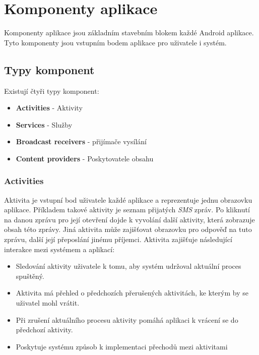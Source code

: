 \section{Komponenty aplikace}
Komponenty aplikace jsou základním stavebním blokem každé Android aplikace. Tyto komponenty jsou vstupním bodem aplikace pro uživatele i systém.

    \subsection{Typy komponent}
    Existují čtyři typy komponent:
    \begin{itemize}
        \item \textbf{Activities} - Aktivity
        \item \textbf{Services} - Služby
        \item \textbf{Broadcast receivers} - přijímače vysílání
        \item \textbf{Content providers} - Poskytovatele obsahu
    \end{itemize}

        \subsubsection{Activities}
        Aktivita je vstupní bod uživatele každé aplikace a reprezentuje jednu obrazovku aplikace. Příkladem takové aktivity je seznam přijatých \emph{SMS} zpráv. Po kliknutí na danou zprávu pro její otevření dojde k vyvolání další aktivity, která zobrazuje obsah této zprávy. Jiná aktivita může zajišťovat obrazovku pro odpověď na tuto zprávu, další její přeposlání jinému příjemci. Aktivita zajišťuje následující interakce mezi systémem a aplikací:
        \begin{itemize}
            \item Sledování aktivity uživatele k tomu, aby systém udržoval aktuální proces spuštěný.
            \item Aktivita má přehled o předchozích přerušených aktivitách, ke kterým by se uživatel mohl vrátit.
            \item Při zrušení aktuálního procesu aktivity pomáhá aplikaci k vrácení se do předchozí aktivity.
            \item Poskytuje systému způsob k implementaci přechodů mezi aktivitami
        \end{itemize}

